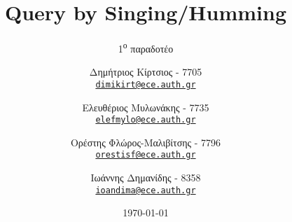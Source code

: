 

\subject{Τεχνολογία του Ήχου και της Εικόνας}
\title{Query by Singing/Humming}
\subtitle{1\textsuperscript{ο} παραδοτέο}
\author{
	Δημήτριος Κίρτσιος - 7705\\ \texttt{\href{mailto:dimikirt@ece.auth.gr}{dimikirt@ece.auth.gr}}
	\and Ελευθέριος Μυλωνάκης - 7735\\ \texttt{\href{mailto:elefmylo@ece.auth.gr}{elefmylo@ece.auth.gr}}
	\and Ορέστης Φλώρος-Μαλιβίτσης - 7796\\ \texttt{\href{mailto:orestisf@ece.auth.gr}{orestisf@ece.auth.gr}}
	\and Ιωάννης Δημανίδης - 8358\\ \texttt{\href{mailto:ioandima@ece.auth.gr}{ioandima@ece.auth.gr}}
}
\date{\vspace{10cm}\today}


	\maketitle
	\tableofcontents
	\clearpage
	\setcounter{page}{1}

	
    
	
    
    
	
	
	

    

